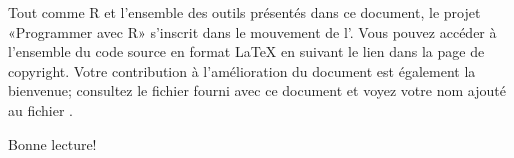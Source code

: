 Tout comme R et l'ensemble des outils présentés dans ce document, le
projet «Programmer avec R» s'inscrit dans le mouvement de
l'. Vous pouvez accéder à l'ensemble du code source en format
{\LaTeX} en suivant le lien dans la page de copyright. Votre
contribution à l'amélioration du document est également la bienvenue;
consultez le fichier  fourni avec ce document
et voyez votre nom ajouté au fichier .

Bonne lecture!

